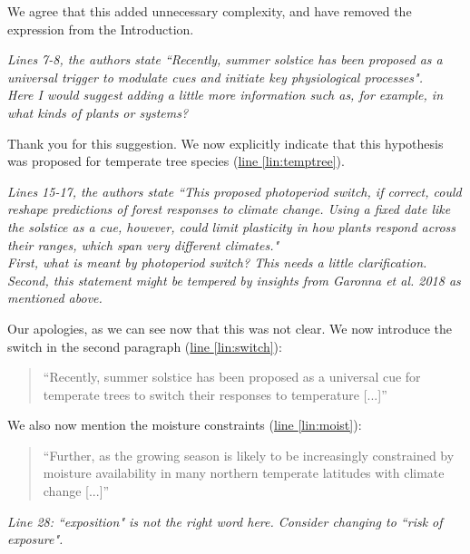 \documentclass[11pt,letter]{article}
\begin{document}
We agree that this added unnecessary complexity, and have removed the expression from the Introduction.\\

\begin{mybox}
\emph{Lines 7-8, the authors state ``Recently, summer solstice has been proposed as a universal trigger to modulate cues and initiate key physiological processes".\\
Here I would suggest adding a little more information such as, for example, in what kinds of plants or systems?}
\end{mybox}

Thank you for this suggestion. We now explicitly indicate that this hypothesis was proposed for temperate tree species (\href{file:synchrony_r1\#lintarget:temptree}{line \ref*{lin:temptree}}).\\

\begin{mybox}
\emph{Lines 15-17, the authors state ``This proposed photoperiod switch, if correct, could reshape predictions of forest responses to climate change. Using a fixed date like the solstice as a cue, however, could limit plasticity in how plants respond across their ranges, which span very different climates."\\
First, what is meant by photoperiod switch? This needs a little clarification. Second, this statement might be tempered by insights from Garonna et al. 2018 as mentioned above.}
\end{mybox}

Our apologies, as we can see now that this was not clear. We now introduce the switch in the second paragraph (\href{file:synchrony_r1\#lintarget:switch}{line \ref*{lin:switch}}):
\begin{quote}
    ``Recently, summer solstice has been proposed as a universal cue for temperate trees to switch their responses to temperature [...]''
\end{quote}
We also now mention the moisture constraints (\href{file:synchrony_r1\#lintarget:moist}{line \ref*{lin:moist}}):
\begin{quote}
    ``Further, as the growing season is likely to be increasingly constrained by moisture availability in many northern temperate latitudes with climate change \citep{Garonna2018} [...]''
\end{quote}

\begin{mybox}
\emph{Line 28: ``exposition" is not the right word here. Consider changing to ``risk of exposure".}
\end{mybox}
\end{document}
